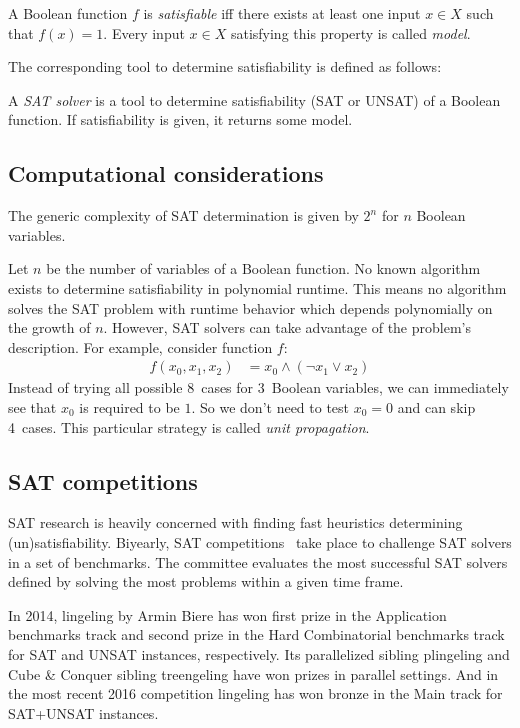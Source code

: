 \begin{defi}
  A Boolean function $f$ is \emph{satisfiable} iff there exists at least one
  input $x \in X$ such that $f(x) = 1$.
  Every input $x \in X$ satisfying this property is called \emph{model}.
\end{defi}

The corresponding tool to determine satisfiability is defined as follows:

\begin{defi}
  A \emph{SAT solver} is a tool to determine satisfiability (SAT or UNSAT)
  of a Boolean function. If satisfiability is given, it returns some model.
\end{defi}

\subsection{Computational considerations}
\label{sec:sat-complexity}
%
The generic complexity of SAT determination is given by $2^n$ for $n$ Boolean variables.

Let $n$ be the number of variables of a Boolean function.
No known algorithm exists to determine satisfiability in polynomial runtime.
This means no algorithm solves the SAT problem with runtime behavior
which depends polynomially on the growth of $n$.
%
However, SAT solvers can take advantage of the problem's description.
For example, consider function $f$:
\begin{align} f(x_0, x_1, x_2) &= x_0 \land (\neg x_1 \lor x_2) \label{eq:3f} \end{align}
Instead of trying all possible 8~cases for 3~Boolean variables,
we can immediately see that $x_0$ is required to be $1$.
So we don't need to test $x_0 = 0$ and can skip 4~cases.
This particular strategy is called \emph{unit propagation}.

\subsection{SAT competitions}
\label{sec:sat-competitions}
%
SAT research is heavily concerned with finding fast heuristics
determining (un)satisfiability. Biyearly,
SAT competitions~\cite{satcomp} take place to challenge
SAT solvers in a set of benchmarks. The committee evaluates the most successful
SAT solvers defined by solving the most problems within a given time frame.

In 2014, lingeling by Armin Biere has won first prize in
the Application benchmarks track and second prize in the Hard Combinatorial benchmarks
track for SAT and UNSAT instances, respectively. Its parallelized sibling plingeling
and Cube \& Conquer sibling treengeling have won prizes in parallel settings.
And in the most recent 2016 competition lingeling has won bronze in the Main track
for SAT+UNSAT instances.

